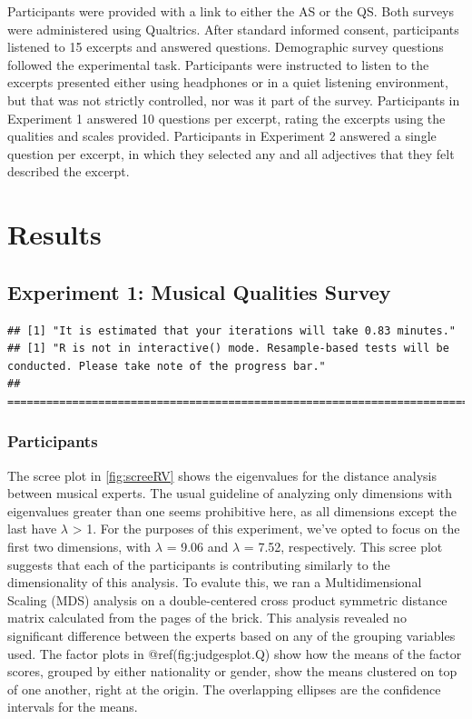 \documentclass[
  english,
  man,floatsintext]{apa6}
\begin{document}
Participants were provided with a link to either the AS or the QS. Both surveys were administered using Qualtrics. After standard informed consent, participants listened to 15 excerpts and answered questions. Demographic survey questions followed the experimental task. Participants were instructed to listen to the excerpts presented either using headphones or in a quiet listening environment, but that was not strictly controlled, nor was it part of the survey. Participants in Experiment 1 answered 10 questions per excerpt, rating the excerpts using the qualities and scales provided. Participants in Experiment 2 answered a single question per excerpt, in which they selected any and all adjectives that they felt described the excerpt.

\hypertarget{results}{%
\section{Results}\label{results}}

\hypertarget{experiment-1-musical-qualities-survey}{%
\subsection{Experiment 1: Musical Qualities Survey}\label{experiment-1-musical-qualities-survey}}

\begin{verbatim}
## [1] "It is estimated that your iterations will take 0.83 minutes."
## [1] "R is not in interactive() mode. Resample-based tests will be conducted. Please take note of the progress bar."
## ================================================================================
\end{verbatim}

\hypertarget{participants-1}{%
\subsubsection{Participants}\label{participants-1}}

The scree plot in \ref{fig:screeRV} shows the eigenvalues for the distance analysis between musical experts. The usual guideline of analyzing only dimensions with eigenvalues greater than one seems prohibitive here, as all dimensions except the last have \(\lambda\) \textgreater{} 1. For the purposes of this experiment, we've opted to focus on the first two dimensions, with \(\lambda\) = 9.06 and \(\lambda\) = 7.52, respectively. This scree plot suggests that each of the participants is contributing similarly to the dimensionality of this analysis. To evalute this, we ran a Multidimensional Scaling (MDS) analysis on a double-centered cross product symmetric distance matrix calculated from the pages of the brick. This analysis revealed no significant difference between the experts based on any of the grouping variables used. The factor plots in @ref(fig:judgesplot.Q) show how the means of the factor scores, grouped by either nationality or gender, show the means clustered on top of one another, right at the origin. The overlapping ellipses are the confidence intervals for the means.
\end{document}
